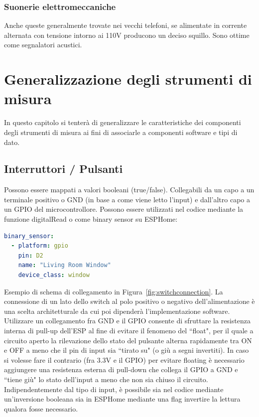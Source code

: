 \documentclass[12pt,a4paper]{report}
\begin{document}
\subsection{Suonerie elettromeccaniche}
Anche queste generalmente trovate nei vecchi telefoni, se alimentate in corrente alternata con tensione intorno ai 110V
producono un deciso squillo. Sono ottime come segnalatori acustici.

\chapter{Generalizzazione degli strumenti di misura}
In questo capitolo si tenterà di generalizzare le caratteristiche dei componenti degli strumenti di misura ai fini di associarle a componenti
software e tipi di dato.

\section{Interruttori / Pulsanti}
Possono essere mappati a valori booleani (true/false). Collegabili da un capo a un terminale positivo o GND (in base a come viene letto
l'input) e dall'altro capo a un GPIO del microcontrollore. 
Possono essere utilizzati nel codice mediante la funzione digitalRead o come binary sensor su ESPHome\cite{esphomeio}:
\begin{lstlisting}[language=yaml]
binary_sensor:
  - platform: gpio
    pin: D2
    name: "Living Room Window"
    device_class: window
\end{lstlisting}
\noindent Esempio di schema di collegamento in Figura~\ref{fig:switchconnection}.
La connessione di un lato dello switch al polo positivo o negativo dell'alimentazione è una scelta architetturale da cui poi dipenderà
l'implementazione software.
Utilizzare un collegamento fra GND e il GPIO consente di sfruttare la resistenza interna di pull-up dell'ESP al fine di evitare il fenomeno
del ``float", per il quale a circuito aperto la rilevazione dello stato del pulsante alterna rapidamente tra ON e OFF a meno che il pin
di input sia ``tirato su" (o giù a segni invertiti).
In caso si volesse fare il contrario (fra 3.3V e il GPIO) per evitare floating è necessario aggiungere una resistenza esterna
di pull-down che collega il GPIO a GND e ``tiene giù" lo stato dell'input a meno che non sia chiuso il circuito.
Indipendentemente dal tipo di input, è possibile sia nel codice mediante un'inversione booleana sia in ESPHome mediante una flag
invertire la lettura qualora fosse necessario.
\end{document}
